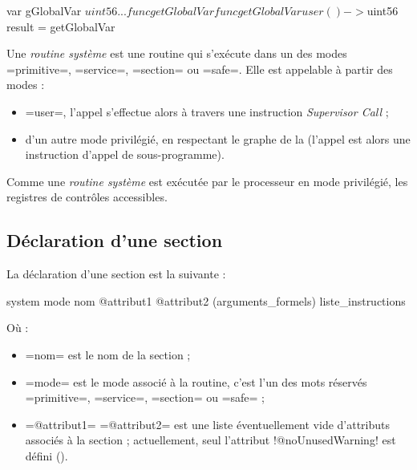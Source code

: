 \begin{PLM}
var gGlobalVar $uint56 {
  ...
  func getGlobalVar
}

func getGlobalVar user () -> $uint56 {
  result = getGlobalVar
}
\end{PLM}





















Une \emph{routine système} est une routine qui s'exécute dans un des modes \plm=primitive=, \plm=service=, \plm=section= ou \plm=safe=. Elle est appelable à partir des modes :
\begin{itemize}
 \item \plm=user=, l'appel s'effectue alors à travers une instruction \emph{Supervisor Call} ;
  \item d'un autre mode privilégié, en respectant le graphe de la  (l'appel est alors une instruction d'appel de sous-programme).
\end{itemize}

Comme une \emph{routine système} est exécutée par le processeur en mode privilégié, les registres de contrôles accessibles.




\subsection{Déclaration d'une section}


La déclaration d'une section est la suivante :
\begin{PLM}
system mode nom @attribut1 @attribut2 (arguments_formels) {
  liste_instructions
}
\end{PLM}
Où :
\begin{itemize}
  \item \plm=nom= est le nom de la section ;
  \item \plm=mode= est le mode associé à la routine, c'est l'un des mots réservés \plm=primitive=, \plm=service=, \plm=section= ou \plm=safe= ;
  \item \plm=@attribut1= \plm=@attribut2= est une liste éventuellement vide d'attributs associés à la section ; actuellement, seul l'attribut \plm!@noUnusedWarning! est défini ().
\end{itemize}



